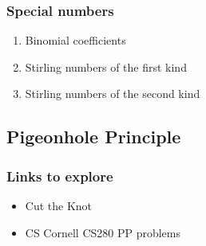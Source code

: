 \documentclass{article}
\begin{document}
\subsubsection{Special numbers}
\begin{enumerate}
	\item Binomial coefficients
	\item Stirling numbers of the first kind
	\item Stirling numbers of the second kind
\end{enumerate}

\subsection{Pigeonhole Principle}
\subsubsection{Links to explore}
\begin{itemize}
    \item Cut the Knot
    \item CS Cornell CS280 PP problems
\end{itemize}
\end{document}
